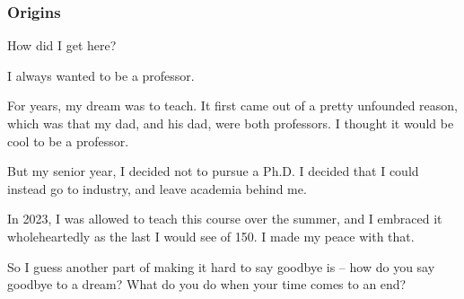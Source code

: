 \documentclass[aspectratio=169, handout]{beamer}
\begin{document}
\begin{frame}[fragile]
  \frametitle{Origins}

  How did I get here?

  \pause
  \vspace{\fill}

  I always wanted to be a professor.

  \pause
  \vspace{\fill}

  For years, my dream was to teach. It first came out of a pretty unfounded
  reason, which was that my dad, and his dad, were both professors. I thought
  it would be cool to be a professor.

  \pause
  \vspace{\fill}

  But my senior year, I decided not to pursue a Ph.D. I decided that I could
  instead go to industry, and leave academia behind me.


  \pause
  \vspace{\fill}

  In 2023, I was allowed to teach this course over the summer, and I
  embraced it wholeheartedly as the last I would see of 150. I made my
  peace with that.


  \pause
  \vspace{\fill}

  So I guess another part of making it hard to say goodbye is -- how do you
  say goodbye to a dream? What do you do when your time comes to an end?
\end{frame}
\end{document}
